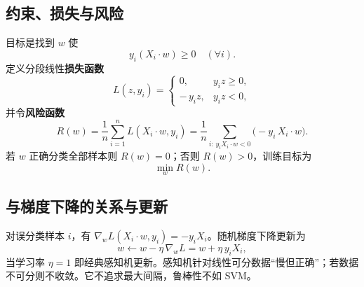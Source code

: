 \documentclass[10.5pt,hyperref,a4paper,UTF8]{ctexart}
\begin{document}
\subsection{约束、损失与风险}
目标是找到 $w$ 使
\[
y_i(X_i\cdot w)\ge 0\quad(\forall i).
\]
定义分段线性\textbf{损失函数}
\[
L(z,y_i)=
\begin{cases}
0,& y_i z\ge 0,\\
-\,y_i z,& y_i z<0,
\end{cases}
\]
并令\textbf{风险函数}
\[
R(w)=\frac{1}{n}\sum_{i=1}^n L(X_i\cdot w,y_i)
=\frac{1}{n}\sum_{i:\,y_iX_i\cdot w<0}\!\!\!\!\big(-y_i\,X_i\cdot w\big).
\]
若 $w$ 正确分类全部样本则 $R(w)=0$；否则 $R(w)>0$，训练目标为
\[
\min_w R(w).
\]

\subsection{与梯度下降的关系与更新}
对误分类样本 $i$，有 $\nabla_w L(X_i\cdot w,y_i)=-y_i X_i$。随机梯度下降更新为
\[
w\leftarrow w-\eta\,\nabla_w L
= w+\eta\,y_i X_i,
\]
当学习率 $\eta=1$ 即经典感知机更新。感知机针对线性可分数据“慢但正确”；若数据不可分则不收敛。它不追求最大间隔，鲁棒性不如 SVM。





\newpage
{}
\end{document}
